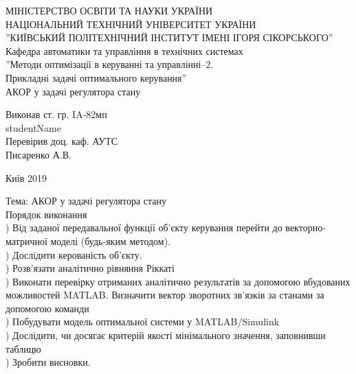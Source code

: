 \documentclass[a4paper]{article}
\begin{document}
 
\begin{center}
\hfill \break
\large{МІНІСТЕРСТВО ОСВІТИ ТА НАУКИ УКРАЇНИ}\\
\large{НАЦІОНАЛЬНИЙ ТЕХНІЧНИЙ УНІВЕРСИТЕТ УКРАЇНИ}\\
\large{''КИЇВСЬКИЙ ПОЛІТЕХНІЧНИЙ ІНСТИТУТ ІМЕНІ ІГОРЯ СІКОРСЬКОГО''}\\

\hfill \break
\normalsize{Кафедра автоматики та управління в технічних системах}\\
\hfill\break
\hfill \break
\hfill \break
\hfill \break
\large{''Методи оптимізації в керуванні та управлінні–2.}\\
\large{Прикладні задачі оптимального керування''}\\
\hfill \break
\hfill \break
\hfill \break
\normalsize{АКОР у задачі регулятора стану}\\
\hfill \break
\hfill \break
\hfill \break
\hfill \break
\end{center}
\hfill \break
\hfill \break
\begin{flushright} 
Виконав ст. гр. IA-82мп\\
{{studentName}}\\
\hfill \break
\hfill \break
Перевірив доц. каф. АУТС\\
Писаренко А.В.\\
\end{flushright}
\hfill \break
\hfill \break
\hfill \break
\hfill \break
\hfill \break
\hfill \break
\begin{center} Київ 2019 \end{center}
 
 
\newpage
Тема: АКОР у задачі регулятора стану\\
\hfill \break
Порядок виконання\\
\hfill \break
{}) Від заданої передавальної функції об’єкту керування перейти до
векторно-матричної моделі (будь-яким методом).\\

\hfill \break
{}) Дослідити керованість об’єкту.\\
\hfill \break
{}) Розв’язати аналітично рівняння Ріккаті \\
\hfill \break
{}) Виконати перевірку отриманих аналітично результатів за допомогою
вбудованих можливостей MATLAB. Визначити вектор зворотних зв’язків за
станами за допомогою команди \\
\hfill \break
{}) Побудувати модель оптимальної системи у MATLAB/Simulink\\
\hfill \break
{}) Дослідити, чи досягає критерій якості мінімального значення,
заповнивши таблицю\\
\hfill \break
{}) Зробити висновки.\\
\end{document}
